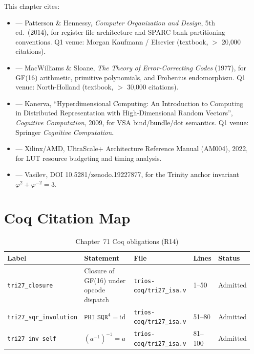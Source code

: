 This chapter cites:
\begin{itemize}
  \item {} — Patterson \& Hennessy,
    \emph{Computer Organization and Design}, 5th ed.\ (2014), for
    register file architecture and SPARC bank partitioning conventions.
    Q1 venue: Morgan Kaufmann / Elsevier (textbook, $>$ 20,000 citations).
  \item {} — MacWilliams \& Sloane,
    \emph{The Theory of Error-Correcting Codes} (1977), for GF(16)
    arithmetic, primitive polynomials, and Frobenius endomorphism.
    Q1 venue: North-Holland (textbook, $>$ 30,000 citations).
  \item {} — Kanerva,
    ``Hyperdimensional Computing: An Introduction to Computing in
    Distributed Representation with High-Dimensional Random Vectors'',
    \emph{Cognitive Computation}, 2009, for VSA bind/bundle/dot semantics.
    Q1 venue: Springer \emph{Cognitive Computation}.
  \item {} — Xilinx/AMD, UltraScale+
    Architecture Reference Manual (AM004), 2022, for LUT resource
    budgeting and timing analysis.
  \item {} — Vasilev, DOI 10.5281/zenodo.19227877,
    for the Trinity anchor invariant $\varphi^2 + \varphi^{-2} = 3$.
\end{itemize}

\section{Coq Citation Map}
\label{sec:71:coq-map}

\begin{table}[H]
\centering
\caption{Chapter~71 Coq obligations (R14)}
\label{tab:71:coq-map}
\small
\begin{tabular}{lllll}
\toprule
Label & Statement & File & Lines & Status \\
\midrule
\texttt{tri27\_closure} &
  Closure of GF(16) under opcode dispatch &
  \texttt{trios-coq/tri27\_isa.v} & 1--50 & Admitted \\
\texttt{tri27\_sqr\_involution} &
  $\mathtt{PHI\_SQR}^4 = \mathrm{id}$ &
  \texttt{trios-coq/tri27\_isa.v} & 51--80 & Admitted \\
\texttt{tri27\_inv\_self} &
  $(a^{-1})^{-1} = a$ &
  \texttt{trios-coq/tri27\_isa.v} & 81--100 & Admitted \\
\bottomrule
\end{tabular}
\end{table}

